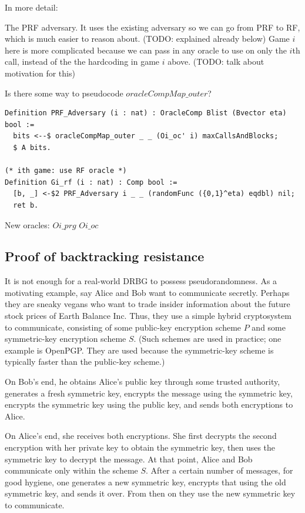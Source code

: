 \documentclass[12pt,lot, lof]{puthesis}
\begin{document}
In more detail:

The PRF adversary. It uses the existing adversary so we can go from PRF to RF, which is much easier to reason about. (TODO: explained already below) Game $i$ here is more complicated because we can pass in any oracle to use on only the $i$th call, instead of the the hardcoding in game $i$ above. (TODO: talk about motivation for this)

Is there some way to pseudocode $oracleCompMap\_outer$?

\begin{lstlisting}
Definition PRF_Adversary (i : nat) : OracleComp Blist (Bvector eta) bool :=
  bits <--$ oracleCompMap_outer _ _ (Oi_oc' i) maxCallsAndBlocks;
  $ A bits.

(* ith game: use RF oracle *)
Definition Gi_rf (i : nat) : Comp bool :=
  [b, _] <-$2 PRF_Adversary i _ _ (randomFunc ({0,1}^eta) eqdbl) nil;
  ret b.
\end{lstlisting}

New oracles:
$Oi\_prg$
$Oi\_oc$


\subsection{Proof of backtracking resistance}

It is not enough for a real-world DRBG to possess pseudorandomness. As a motivating example, say Alice and Bob want to communicate secretly. Perhaps they are sneaky vegans who want to trade insider information about the future stock prices of Earth Balance Inc. Thus, they use a simple hybrid cryptosystem to communicate, consisting of some public-key encryption scheme $P$ and some symmetric-key encryption scheme $S$. (Such schemes are used in practice; one example is OpenPGP. They are used because the symmetric-key scheme is typically faster than the public-key scheme.)

On Bob's end, he obtains Alice's public key through some trusted authority, generates a fresh symmetric key, encrypts the message using the symmetric key, encrypts the symmetric key using the public key, and sends both encryptions to Alice.

On Alice's end, she receives both encryptions. She first decrypts the second encryption with her private key to obtain the symmetric key, then uses the symmetric key to decrypt the message. At that point, Alice and Bob communicate only within the scheme $S$. After a certain number of messages, for good hygiene, one generates a new symmetric key, encrypts that using the old symmetric key, and sends it over. From then on they use the new symmetric key to communicate.
\end{document}
